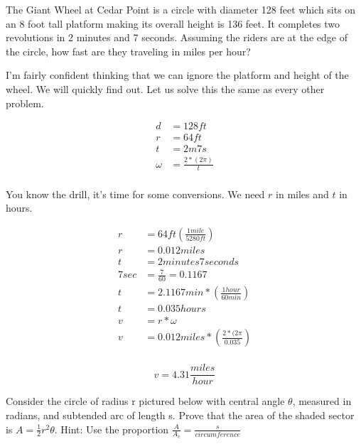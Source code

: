 \documentclass[10pt,letterpaper]{amspset}
\begin{document}
\begin{problem}[55.]
The Giant Wheel at Cedar Point is a circle with diameter 128 feet which sits on an 8 foot tall
platform making its overall height is 136 feet. It completes two revolutions in 2 minutes and 7 seconds. Assuming the riders are at the edge of the circle, how fast are they traveling in miles per hour?
\end{problem}

\begin{solution}[Solution]
I'm fairly confident thinking that we can ignore the platform and height of the wheel. We will quickly find out. Let us solve this the same as every other problem. 

\begin{align}
    d &= 128ft \\
    r &= 64ft \\
    t &= 2m7s \\
    \omega &= \frac{2 * (2\pi)}{t} \\
\end{align}

You know the drill, it's time for some conversions. We need $r$ in miles and $t$ in hours.

\begin{align}
    r &= 64ft \left( \frac{1mile}{5280ft} \right) \\[+1mm]
    r &= 0.012miles \\[+2mm]
    t &= 2minutes7seconds \\[+2mm]
    7sec &= \frac{7}{60} = 0.1167 \\[+2mm]
    t &= 2.1167min * \left( \frac{1hour}{60min} \right) \\[+2mm]
    t &= 0.035hours \\[+2mm]
    v &= r * \omega \\
    v &= 0.012miles * \left( \frac{2 * (2\pi}{0.035} \right) \\
    \end{align}
    
\[\boxed{v = 4.31 \frac{miles}{hour}}\]
\end{solution}


\begin{problem}[56.]
Consider the circle of radius r pictured below with central angle $\theta$, measured in radians, and subtended arc of length s. Prove that the area of the shaded sector is $A = \frac{1}{2} r^2 \theta$.  
Hint: Use the proportion $\frac{A}{A_c} = \frac{s}{circumference}$
\end{problem}
\end{document}
